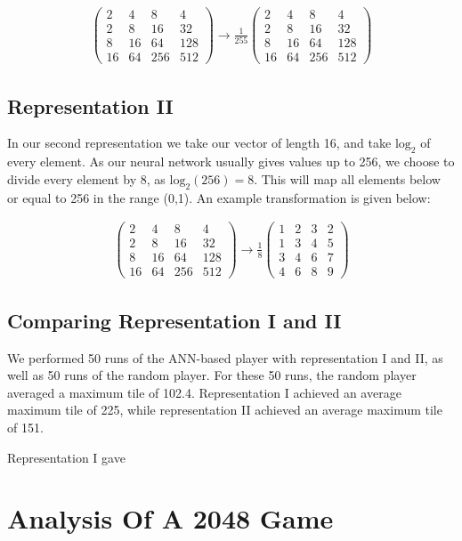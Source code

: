 \documentclass[11pt,a4paper]{article}
\begin{document}
\begin{align*}
\begin{pmatrix}
  2  &  4 &   8 &  4\\
  2  &  8 &  16 & 32 \\
  8  & 16 &  64 & 128 \\
  16 & 64 & 256 & 512
\end{pmatrix}
\rightarrow
\frac{1}{255}
\begin{pmatrix}
  2  &  4 &   8 &  4\\
  2  &  8 &  16 & 32 \\
  8  & 16 &  64 & 128 \\
  16 & 64 & 256 & 512
\end{pmatrix}
\end{align*}

\subsection*{Representation II}
In our second representation we take our vector of length 16, and take $\textrm{log}_2$ of every element. As our neural network usually gives values up to 256, we choose to divide every element by 8, as $\textrm{log}_2(256) = 8$. This will map all elements below or equal to 256 in the range (0,1). An example transformation is given below:

\begin{align*}
\begin{pmatrix}
  2  &  4 &   8 &  4\\
  2  &  8 &  16 & 32 \\
  8  & 16 &  64 & 128 \\
  16 & 64 & 256 & 512
\end{pmatrix}
\rightarrow
\frac{1}{8}
\begin{pmatrix}
  1 & 2 & 3 & 2 \\
  1 & 3 & 4 & 5 \\
  3 & 4 & 6 & 7 \\
  4 & 6 & 8 & 9
\end{pmatrix}
\end{align*}

\subsection*{Comparing Representation I and II}
We performed 50 runs of the ANN-based player with representation I and II, as well as 50 runs of the random player. For these 50 runs, the random player averaged a maximum tile of 102.4. Representation I achieved an average maximum tile of 225, while representation II achieved an average maximum tile of 151.

Representation I gave  



\section*{Analysis Of A 2048 Game}
\end{document}
